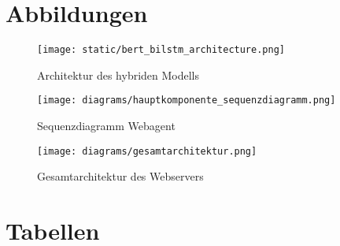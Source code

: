 \newpage

\section{Abbildungen}

\begin{figure}[htbp]
    \begin{center}
        \texttt{[image: static/bert\_bilstm\_architecture.png]}
        \caption{\label{fig:bert_bilstm_architecture} Architektur des hybriden Modells \cite{wang2021covid19fakenewsdetection}}
    \end{center}
\end{figure}

\begin{figure}[htbp]
    \begin{center}
        \texttt{[image: diagrams/hauptkomponente\_sequenzdiagramm.png]}
        \caption{\label{fig:seq_hauptkomponente} Sequenzdiagramm Webagent}
    \end{center}
\end{figure}

\begin{figure}[htbp]
    \begin{center}
        \texttt{[image: diagrams/gesamtarchitektur.png]}
        \caption{\label{fig:gesamtarchitektur} Gesamtarchitektur des Webservers}
    \end{center}
\end{figure}

\newpage

\section{Tabellen}


